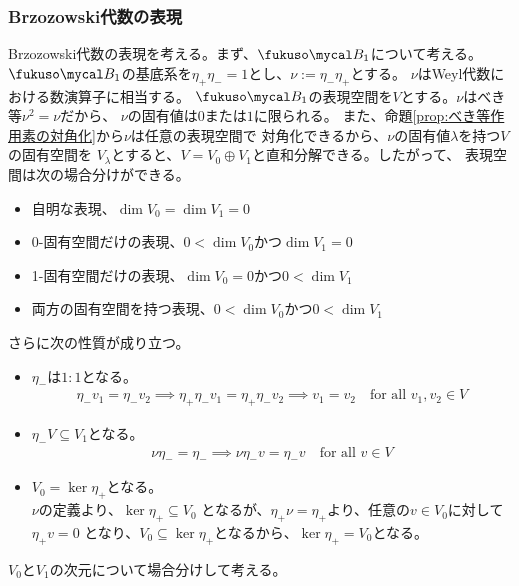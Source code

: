 {\subsubsection{Brzozowski代数の表現}\label{s3:Brzozowski代数の表現} %
	Brzozowski代数の表現を考える。まず、$\fukuso\B_1$について考える。
	$\fukuso\B_1$の基底系を$\eta_+\eta_-=1$とし、$\nu:=\eta_-\eta_+$とする。
	$\nu$はWeyl代数における数演算子に相当する。
	$\fukuso\B_1$の表現空間を$V$とする。$\nu$はべき等$\nu^2=\nu$だから、
	$\nu$の固有値は$0$または$1$に限られる。
	また、命題\ref{prop:べき等作用素の対角化}から$\nu$は任意の表現空間で
	対角化できるから、$\nu$の固有値$\lambda$を持つ$V$の固有空間を
	$V_\lambda$とすると、$V=V_0\oplus V_1$と直和分解できる。したがって、
	表現空間は次の場合分けができる。
	\begin{itemize}\setlength{\itemsep}{-1mm} %
		\item 自明な表現、$\dim V_0=\dim V_1=0$
		\item 0-固有空間だけの表現、$0<\dim V_0$かつ$\dim V_1=0$
		\item 1-固有空間だけの表現、$\dim V_0=0$かつ$0<\dim V_1$
		\item 両方の固有空間を持つ表現、$0<\dim V_0$かつ$0<\dim V_1$
	\end{itemize} %
	さらに次の性質が成り立つ。
	\begin{itemize}\setlength{\itemsep}{-1mm} %
		\item $\eta_-$は$1:1$となる。
		\begin{equation*}\begin{split}
			\eta_-v_1 = \eta_-v_2 \implies \eta_+\eta_-v_1 = \eta_+\eta_-v_2 
			\implies v_1 = v_2 \quad\text{for all } v_1,v_2\in V
		\end{split}\end{equation*}
		\item $\eta_-V\subseteq V_1$となる。
		\begin{equation*}\begin{split}
			\nu\eta_- = \eta_-\implies
			\nu\eta_-v = \eta_-v \quad\text{for all } v\in V
		\end{split}\end{equation*}
		\item $V_0=\ker\eta_+$となる。\\
		$\nu$の定義より、$\ker\eta_+\subseteq V_0$
		となるが、$\eta_+\nu=\eta_+$より、任意の$v\in V_0$に対して$\eta_+v=0$
		となり、$V_0\subseteq\ker\eta_+$となるから、$\ker\eta_+=V_0$となる。
	\end{itemize} %
	$V_0$と$V_1$の次元について場合分けして考える。
}
